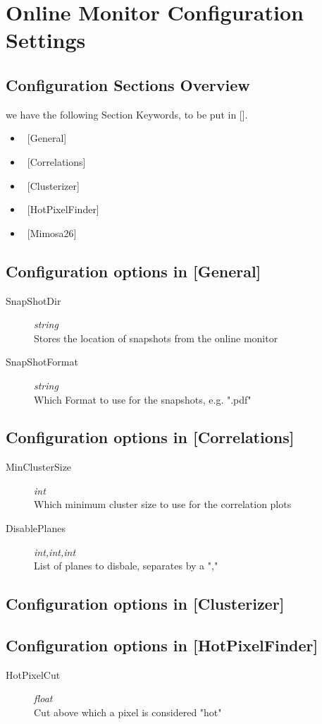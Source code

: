 \section{Online Monitor Configuration Settings}
\subsection{Configuration Sections Overview}
we have the following Section Keywords, to be put in [].
\begin{itemize}
\item  ~[General]
\item ~[Correlations]
\item ~[Clusterizer]
\item ~[HotPixelFinder]
\item ~[Mimosa26]
\end{itemize}
\subsection{Configuration options in [General]} 
\begin{description}
\item[SnapShotDir] \textit{string} \\Stores the location of snapshots from the online monitor
\item[SnapShotFormat] \textit{string}\\ Which Format to use for the snapshots, e.g. ".pdf"
\end{description}
\subsection{Configuration options in [Correlations]}
\begin{description}
\item[MinClusterSize] \textit{int} \\
Which minimum cluster size to use for the correlation plots  
\item[DisablePlanes] \textit{int,int,int} \\
List of planes to disbale, separates by a ","
\end{description}
\subsection{Configuration options in [Clusterizer]}
\subsection{Configuration options in [HotPixelFinder]}
\begin{description}
\item[HotPixelCut] \textit{float} \\ Cut above which a pixel is considered "hot"
\end{description}
